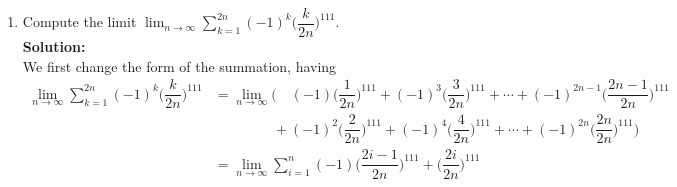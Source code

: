 \documentclass{article}
\begin{document}
\begin{enumerate}[(1)]
\begin{enumerate}
        Since $\displaystyle\lim_{R\to\infty}{\int_1^R{\dfrac{\arctan{\alpha x}}{x}dx}}$ diverges (we can prove this by using the same method with regard to the comparison test for improper integrals in \hyperref[1.(b)]{Question 1 (1) (b)}), $I$ diverges.\\
        Therefore, $I$ diverges whenever $a<b=0$.
        \item $a<b<0$\\
        Let $a=-\alpha$ and $b=-\beta$, then $\beta<\alpha$. Since arctangent is an odd function, we have
        \begin{align*}
            I&=-\Big(\lim_{\varepsilon\to0^+}{\int_\varepsilon^1{\dfrac{\arctan{\alpha x}-\arctan{\beta x}}{x}dx}}+\lim_{R\to\infty}{\int_1^R{\dfrac{\arctan{\alpha x}-\arctan{\beta x}}{x}dx}}\Big)\\
            \Leftrightarrow\:\:\:I&=\lim_{\varepsilon\to0^+}{\int_\varepsilon^1{\dfrac{\arctan{\beta x}-\arctan{\alpha x}}{x}dx}}+\lim_{R\to\infty}{\int_1^R{\dfrac{\arctan{\beta x}-\arctan{\alpha x}}{x}dx}}
        \end{align*}
        We find the answer just by algebraically replacing $\beta$ to the position of $a$ and replacing $\alpha$ to the position of $b$ in the result from \hyperref[1.(a)]{Question 1 (1) (a)}, having
        $$\lim_{\varepsilon\to0^+}{\int_\varepsilon^1{\dfrac{\arctan{\beta x}-\arctan{\alpha x}}{x}dx}}+\lim_{R\to\infty}{\int_1^R{\dfrac{\arctan{\beta x}-\arctan{\alpha x}}{x}dx}}=\dfrac{\pi}{2}\ln{\dfrac{\beta}{\alpha}}.$$
        Therefore, $I=\dfrac{\pi}{2}\ln{\dfrac{b}{a}}$ whenever $a<b<0$.
    \end{enumerate}
    \item Compute the limit $\displaystyle\lim_{n\to\infty}{\sum_{k=1}^{2n}{(-1)^k\Big(\dfrac{k}{2n}\Big)^{111}}}$.\\
    \textbf{Solution:}\\
    We first change the form of the summation, having 
    \begin{align*}
        \lim_{n\to\infty}{\sum_{k=1}^{2n}{(-1)^k\Big(\dfrac{k}{2n}\Big)^{111}}}&=\lim_{n\to\infty}{\Bigg(\quad(-1)\Big(\dfrac{1}{2n}\Big)^{111}+(-1)^3\Big(\dfrac{3}{2n}\Big)^{111}+\cdots+(-1)^{2n-1}\Big(\dfrac{2n-1}{2n}\Big)^{111}}\\
        &\quad\quad\quad\quad\:+(-1)^2\Big(\dfrac{2}{2n}\Big)^{111}+(-1)^4\Big(\dfrac{4}{2n}\Big)^{111}+\cdots+(-1)^{2n}\Big(\dfrac{2n}{2n}\Big)^{111}\Bigg)\\
        &=\lim_{n\to\infty}{\sum_{i=1}^{n}{(-1)\Big(\dfrac{2i-1}{2n}\Big)^{111}+\Big(\dfrac{2i}{2n}\Big)^{111}}}\\

\end{align*}
\end{enumerate}
\end{document}
